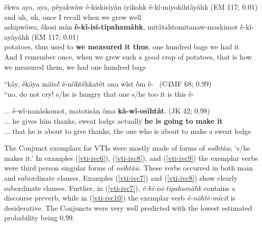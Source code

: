         \begin{exe}
    \ex 
    \gll êkwa aya, aya, pêyakwâw ê-kiskisiyân iyikohk ê-kî-miyokihtâyâhk \tiny{(EM 117; 0.01)}\\
         and uh, uh, once {I recall} when {we grew well} \\
         
    \gll askipwâwa, êkosi mân \textbf{ê-kî-isi-tipahamâhk}, mitâtahtomitanaw-maskimot ê-kî-ayâyâhk \tiny{(EM 117; 0.01)} \\
         potatoes, thus {used to} {\textbf{we measured it thus}}, {one hundred bags} {we had it}  \\
    \trans And I remember once, when we grew such a good crop of potatoes, that is how we measured them, we had one hundred bags \tiny{\citep[84-85]{Minde1997kwayask}}  \\
    \label{vti-ivc7}
    \end{exe}

   \begin{exe}
    \ex 
    \gll ``kây, êkâya mâto! ê-nôhtêhkatêt ana wîst ôm ê-~ \tiny{(C4MF 68; 0.99)}\\
    ``no, {do not} cry! {s/he is hungry} {that one} {s/he too} {it is this} ê-\~ \\
    \label{vti-ivc10}
    \end{exe}

    \begin{exe}
    \ex 
    \gll ... ê-wî-nanâskomot, matotisân ôma \textbf{kâ-wî-osîhtât}. \tiny{(JK 42; 0.98)} \\
         ... {he gives him thanks}, {sweat lodge} actually {\textbf{he is going to make it}} \\
    \trans ... that he is about to give thanks, the one who is about to make a sweat lodge \tiny{\citep[84]{ka2007counselling}} \\
    \label{vti-ivc9}
    \end{exe}
    
 
    
The Conjunct exemplars for VTIs were mostly made of forms of \textit{osîhtâw}, `s/he makes it.' In examples (\ref{vti-ivc6}), (\ref{vti-ivc8}), and (\ref{vti-ivc9}) the exemplar verbs were third person singular forms of \textit{osîhtâw}. These verbs occurred in both main and subordinate clauses. Examples (\ref{vti-ivc7}) and (\ref{vti-ivc8}) show clearly subordinate clauses. Further, in (\ref{vti-ivc7}), \textit{ê-kî-isi-tipahamâhk} contains a discourse preverb, while in (\ref{vti-ivc10}) the exemplar verb \textit{ê-nôhtê-mîcit} is desiderative. The Conjuncts were very well predicted with the lowest estimated probability being 0.99.
    

